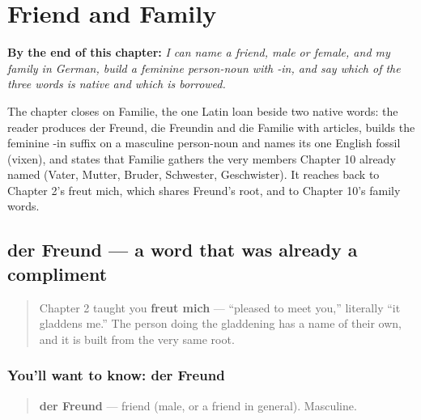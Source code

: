
\chapter{Friend and Family}
\label{ch:ge-friend-and-family}

\begin{chapteropening}
\textbf{By the end of this chapter:} \emph{I can name a friend, male or female, and my family in German, build a feminine person-noun with -in, and say which of the three words is native and which is borrowed.}

The chapter closes on Familie, the one Latin loan beside two native words: the reader produces der Freund, die Freundin and die Familie with articles, builds the feminine -in suffix on a masculine person-noun and names its one English fossil (vixen), and states that Familie gathers the very members Chapter 10 already named (Vater, Mutter, Bruder, Schwester, Geschwister). It reaches back to Chapter 2's freut mich, which shares Freund's root, and to Chapter 10's family words.
\end{chapteropening}

\section[der Freund]{der Freund — a word that was already a compliment}

\label{lesson:GE-C29-freund}



\begin{quote}
Chapter 2 taught you \textbf{freut mich} — \textquotedblleft{}pleased to meet you,\textquotedblright{} literally \textquotedblleft{}it gladdens me.\textquotedblright{} The person doing the gladdening has a name of their own, and it is built from the very same root.
\end{quote}

\subsection*{You'll want to know: der Freund}
\begin{quote}
\textbf{der Freund} — friend (male, or a friend in general). Masculine.
\end{quote}

